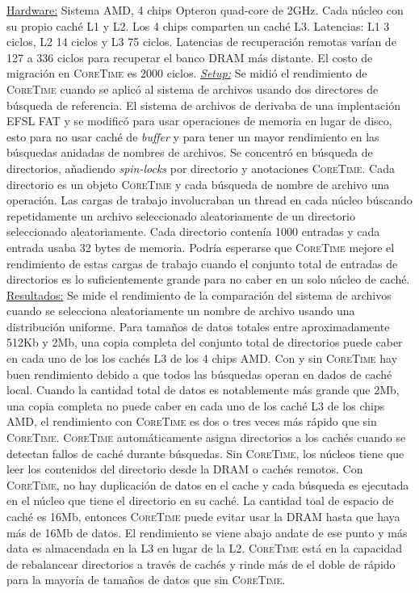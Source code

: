 \underline{Hardware:} Sistema AMD, 4 chips Opteron quad-core de 2GHz. Cada núcleo con su propio caché L1 y L2. Los 4 chips comparten un caché L3. Latencias: L1 3 ciclos, L2 14 ciclos y L3 75 ciclos. Latencias de recuperación remotas varían de 127 a 336 ciclos para recuperar el banco DRAM más distante. El costo de migración en \textsc{CoreTime} es 2000 ciclos. \underline{\emph{Setup:}} Se midió el rendimiento de \textsc{CoreTime} cuando se aplicó al sistema de archivos usando dos directores de búsqueda de referencia. El sistema de archivos de derivaba de una implentación EFSL FAT y se modificó para usar operaciones de memoria en lugar de disco, esto para no usar caché de \emph{buffer} y para tener un mayor rendimiento en las búsquedas anidadas de nombres de archivos. Se concentró en búsqueda de directorios, añadiendo \emph{spin-locks} por directorio y anotaciones \textsc{CoreTime}. Cada directorio es un objeto \textsc{CoreTime} y cada búsqueda de nombre de archivo una operación. Las cargas de trabajo involucraban un thread en cada núcleo búscando repetidamente un archivo seleccionado aleatoriamente de un directorio seleccionado aleatoriamente. Cada directorio contenía 1000 entradas y cada entrada usaba 32 bytes de memoria. Podría esperarse que \textsc{CoreTime} mejore el rendimiento de estas cargas de trabajo cuando el conjunto total de entradas de directorios es lo suficientemente grande para no caber en un solo núcleo de caché. \underline{Resultados:} Se mide el rendimiento de la comparación del sistema de archivos cuando se selecciona aleatoriamente un nombre de archivo usando una distribución uniforme. Para tamaños de datos totales entre aproximadamente 512Kb  y 2Mb, una copia completa del conjunto total de directorios puede caber en cada uno de los los cachés L3 de los 4 chips AMD. Con y sin \textsc{CoreTime} hay buen rendimiento debido a que todos las búsquedas operan en dados de caché local. Cuando la cantidad total de datos es notablemente más grande que 2Mb, una copia completa no puede caber en cada uno de los caché L3 de los chips AMD, el rendimiento con \textsc{CoreTime} es dos o tres veces más rápido que sin \textsc{CoreTime}. \textsc{CoreTime} automáticamente asigna directorios a los cachés cuando se detectan fallos de caché durante búsquedas. Sin \textsc{CoreTime}, los núcleos tiene que leer los contenidos del directorio desde la DRAM o cachés remotos. Con \textsc{CoreTime}, no hay duplicación de datos en el cache y cada búsqueda es ejecutada en el núcleo que tiene el directorio en su caché. La cantidad toal de espacio de caché es 16Mb, entonces \textsc{CoreTime} puede evitar usar la DRAM hasta que haya más de 16Mb de datos. El rendimiento se viene abajo andate de ese punto y más data es almacendada en la L3 en lugar de la L2. \textsc{CoreTime} está en la capacidad de rebalancear directorios a través de cachés y rinde más de el doble de rápido para la mayoría de tamaños de datos que sin \textsc{CoreTime}. 

